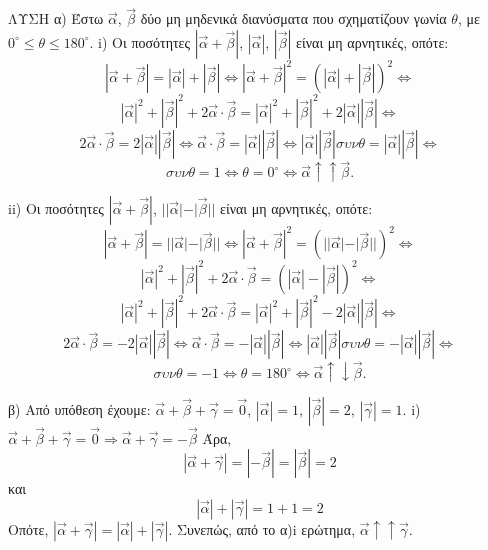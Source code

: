 ΛΥΣΗ
α) Έστω $\vec{\alpha}$, $\vec{\beta}$ δύο μη μηδενικά διανύσματα που σχηματίζουν γωνία $\theta$, με $0^{\circ} \leq \theta \leq 180^{\circ}$.
i) Οι ποσότητες $|\vec{\alpha} + \vec{\beta}|$, $|\vec{\alpha}|$, $|\vec{\beta}|$ είναι μη αρνητικές, οπότε:
\[ |\vec{\alpha} + \vec{\beta}| = |\vec{\alpha}| + |\vec{\beta}| \Leftrightarrow |\vec{\alpha} + \vec{\beta}|^2 = (|\vec{\alpha}| + |\vec{\beta}|)^2 \Leftrightarrow \]
\[ |\vec{\alpha}|^2 + |\vec{\beta}|^2 + 2\vec{\alpha} \cdot \vec{\beta} = |\vec{\alpha}|^2 + |\vec{\beta}|^2 + 2|\vec{\alpha}||\vec{\beta}| \Leftrightarrow \]
\[ 2\vec{\alpha} \cdot \vec{\beta} = 2|\vec{\alpha}||\vec{\beta}| \Leftrightarrow \vec{\alpha} \cdot \vec{\beta} = |\vec{\alpha}||\vec{\beta}| \Leftrightarrow |\vec{\alpha}||\vec{\beta}|\sigma\upsilon\nu\theta = |\vec{\alpha}||\vec{\beta}| \Leftrightarrow \]
\[ \sigma\upsilon\nu\theta = 1 \Leftrightarrow \theta = 0^{\circ} \Leftrightarrow \vec{\alpha} \uparrow\uparrow \vec{\beta}. \]

ii) Οι ποσότητες $|\vec{\alpha} + \vec{\beta}|$, $||\vec{\alpha}| - |\vec{\beta}||$ είναι μη αρνητικές, οπότε:
\[ |\vec{\alpha} + \vec{\beta}| = ||\vec{\alpha}| - |\vec{\beta}|| \Leftrightarrow |\vec{\alpha} + \vec{\beta}|^2 = (||\vec{\alpha}| - |\vec{\beta}||)^2 \Leftrightarrow \]
\[ |\vec{\alpha}|^2 + |\vec{\beta}|^2 + 2\vec{\alpha} \cdot \vec{\beta} = (|\vec{\alpha}| - |\vec{\beta}|)^2 \Leftrightarrow \]
\[ |\vec{\alpha}|^2 + |\vec{\beta}|^2 + 2\vec{\alpha} \cdot \vec{\beta} = |\vec{\alpha}|^2 + |\vec{\beta}|^2 - 2|\vec{\alpha}||\vec{\beta}| \Leftrightarrow \]
\[ 2\vec{\alpha} \cdot \vec{\beta} = -2|\vec{\alpha}||\vec{\beta}| \Leftrightarrow \vec{\alpha} \cdot \vec{\beta} = -|\vec{\alpha}||\vec{\beta}| \Leftrightarrow |\vec{\alpha}||\vec{\beta}|\sigma\upsilon\nu\theta = -|\vec{\alpha}||\vec{\beta}| \Leftrightarrow \]
\[ \sigma\upsilon\nu\theta = -1 \Leftrightarrow \theta = 180^{\circ} \Leftrightarrow \vec{\alpha} \uparrow\downarrow \vec{\beta}. \]

β) Από υπόθεση έχουμε: $\vec{\alpha} + \vec{\beta} + \vec{\gamma} = \vec{0}$, $|\vec{\alpha}| = 1$, $|\vec{\beta}| = 2$, $|\vec{\gamma}| = 1$.
i) $\vec{\alpha} + \vec{\beta} + \vec{\gamma} = \vec{0} \Rightarrow \vec{\alpha} + \vec{\gamma} = -\vec{\beta}$
Άρα,
\[ |\vec{\alpha} + \vec{\gamma}| = |-\vec{\beta}| = |\vec{\beta}| = 2 \]
και
\[ |\vec{\alpha}| + |\vec{\gamma}| = 1 + 1 = 2 \]
Οπότε, $|\vec{\alpha} + \vec{\gamma}| = |\vec{\alpha}| + |\vec{\gamma}|$.
Συνεπώς, από το α)i ερώτημα, $\vec{\alpha} \uparrow\uparrow \vec{\gamma}$.

